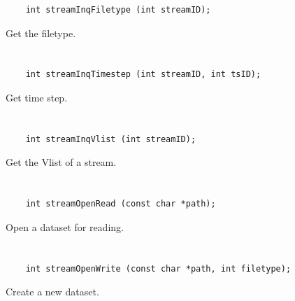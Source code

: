 \begin{verbatim}
    int streamInqFiletype (int streamID);
\end{verbatim}

Get the filetype.


\section*{\tt {}}

\begin{verbatim}
    int streamInqTimestep (int streamID, int tsID);
\end{verbatim}

Get time step.


\section*{\tt {}}

\begin{verbatim}
    int streamInqVlist (int streamID);
\end{verbatim}

Get the Vlist of a stream.


\section*{\tt {}}

\begin{verbatim}
    int streamOpenRead (const char *path);
\end{verbatim}

Open a dataset for reading.


\section*{\tt {}}

\begin{verbatim}
    int streamOpenWrite (const char *path, int filetype);
\end{verbatim}

Create a new dataset.


\section*{\tt {}}

